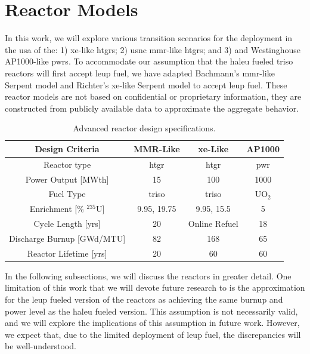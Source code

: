 \section{Reactor Models}
\label{sec:reactor_models}

In this work, we will explore various transition scenarios for the deployment in the \gls{usa} of the: 1) \gls{xe}-like \glspl{htgr}; 2) \gls{usnc} \gls{mmr}-like \glspl{htgr}; and 3) and Westinghouse AP1000-like \glspl{pwr}. To accommodate our assumption that the \gls{haleu} fueled \gls{triso} reactors will first accept \gls{leup} fuel, we have adapted Bachmann's \gls{mmr}-like Serpent model \cite{bachmann_mmr_like_2023} and Richter's \gls{xe}-like Serpent model \cite{richter_xe100_like} to accept \gls{leup} fuel. These reactor models are not based on confidential or proprietary information, they are constructed from publicly available data to approximate the aggregate behavior.

\begin{table}[H]
   \centering
   \caption{Advanced reactor design specifications.}
   \label{tab:ar_defs}
   \begin{tabular}{c c c c}
      \hline
      \textbf{Design Criteria} & \textbf{MMR-Like} \cite{usnc_design_2021} & \textbf{\gls{xe}-Like} \cite{nuscale_chapter_2018} & \textbf{AP1000} \\
      \hline
      Reactor type & \gls{htgr} & \gls{htgr} & \gls{pwr} \\
      Power Output [MWth] & 15 & 100 & 1000 \\
      Fuel Type & \gls{triso} & \gls{triso} & UO$_2$ \\
      Enrichment [\% $^{235}$U] & 9.95, 19.75 & 9.95, 15.5 & 5 \\
      Cycle Length [yrs] & 20 & Online Refuel & 18 \\
      Discharge Burnup [GWd/MTU] & 82 & 168 & 65 \\
      Reactor Lifetime [yrs] & 20 & 60 & 60 \\
      \hline
   \end{tabular}
\end{table}

In the following subsections, we will discuss the reactors in greater detail. One limitation of this work that we will devote future research to is the approximation for the \gls{leup} fueled version of the reactors as achieving the same burnup and power level as the \gls{haleu} fueled version. This assumption is not necessarily valid, and we will explore the implications of this assumption in future work. However, we expect that, due to the limited deployment of \gls{leup} fuel, the discrepancies will be well-understood.


